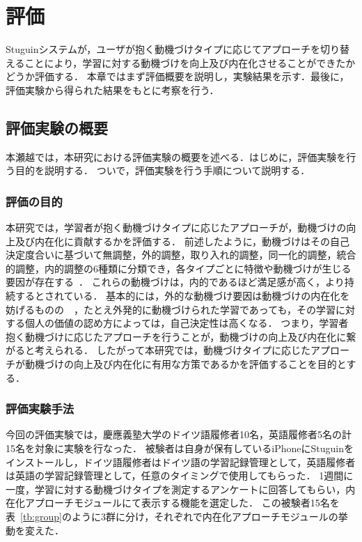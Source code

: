 \chapter{評価}
Stuguinシステムが，ユーザが抱く動機づけタイプに応じてアプローチを切り替えることにより，学習に対する動機づけを向上及び内在化させることができたかどうか評価する．
本章ではまず評価概要を説明し，実験結果を示す．最後に，評価実験から得られた結果をもとに考察を行う．

\section{評価実験の概要}
本瀬越では，本研究における評価実験の概要を述べる．はじめに，評価実験を行う目的を説明する．
ついで，評価実験を行う手順について説明する．

\subsection{評価の目的}
本研究では，学習者が抱く動機づけタイプに応じたアプローチが，動機づけの向上及び内在化に貢献するかを評価する．
前述したように，動機づけはその自己決定度合いに基づいて無調整，外的調整，取り入れ的調整，同一化的調整，統合的調整，内的調整の6種類に分類でき，各タイプごとに特徴や動機づけが生じる要因が存在する~\cite{ryan2000self}．
これらの動機づけは，内的であるほど満足感が高く，より持続するとされている．
基本的には，外的な動機づけ要因は動機づけの内在化を妨げるものの~\cite{moller2006self}~\cite{shimizu}，たとえ外発的に動機づけられた学習であっても，その学習に対する個人の価値の認め方によっては，自己決定性は高くなる．
つまり，学習者抱く動機づけに応じたアプローチを行うことが，動機づけの向上及び内在化に繋がると考えられる．
したがって本研究では，動機づけタイプに応じたアプローチが動機づけの向上及び内在化に有用な方策であるかを評価することを目的とする．

\subsection{評価実験手法}
今回の評価実験では，慶應義塾大学のドイツ語履修者10名，英語履修者5名の計15名を対象に実験を行なった．
被験者は自身が保有しているiPhoneにStuguinをインストールし，ドイツ語履修者はドイツ語の学習記録管理として，英語履修者は英語の学習記録管理として，任意のタイミングで使用してもらった．
1週間に一度，学習に対する動機づけタイプを測定するアンケートに回答してもらい，内在化アプローチモジュールにて表示する機能を選定した．
この被験者15名を表~\ref{tb:group}のように3群に分け，それぞれで内在化アプローチモジュールの挙動を変えた．

